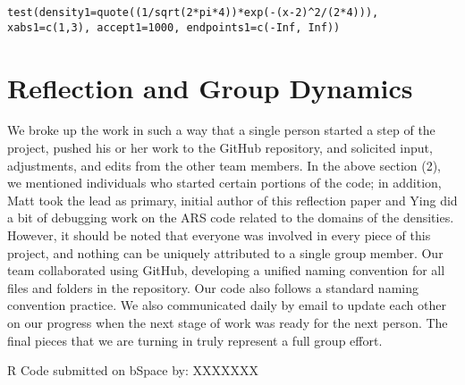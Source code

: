 \documentclass{article}
\begin{document}
\begin{lstlisting}
test(density1=quote((1/sqrt(2*pi*4))*exp(-(x-2)^2/(2*4))), xabs1=c(1,3), accept1=1000, endpoints1=c(-Inf, Inf))
\end{lstlisting}



\section{Reflection and Group Dynamics}
We broke up the work in such a way that a single person started a step of the project, pushed his or her work to the GitHub repository, and solicited input, adjustments, and edits from the other team members.  In the above section (2), we mentioned individuals who started certain portions of the code; in addition, Matt took the lead as primary, initial author of this reflection paper and Ying did a bit of debugging work on the ARS code related to the domains of the densities.  However, it should be noted that everyone was involved in every piece of this project, and nothing can be uniquely attributed to a single group member.  Our team collaborated using GitHub, developing a unified naming convention for all files and folders in the repository. Our code also follows a standard naming convention practice.  We also communicated daily by email to update each other on our progress when the next stage of work was ready for the next person. The final pieces that we are turning in truly represent a full group effort. 

R Code submitted on bSpace by: XXXXXXX
\end{document}
